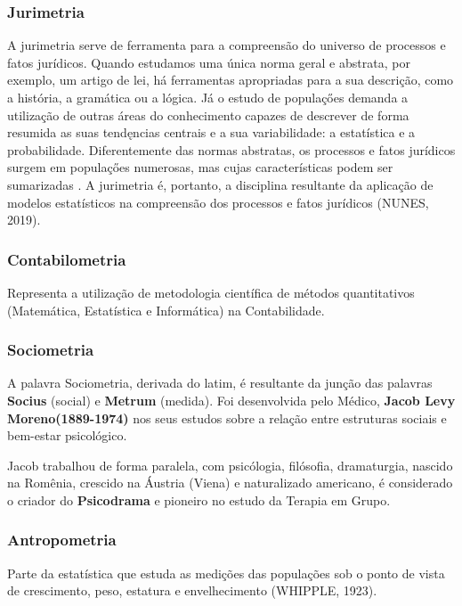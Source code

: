 \subsubsection{Jurimetria} 

A jurimetria serve de ferramenta para a compreensão do universo de processos e fatos jurídicos. Quando estudamos uma única norma geral e abstrata, por exemplo, um artigo de lei, há ferramentas apropriadas para a sua descrição, como a história, a gramática ou a lógica. Já o estudo de populaçőes demanda a utilização de outras áreas do conhecimento capazes de descrever de forma resumida as suas tendęncias centrais e a sua variabilidade: a estatística e a probabilidade. Diferentemente das normas abstratas, os processos e fatos jurídicos surgem em populaçőes numerosas, mas cujas características podem ser sumarizadas . A jurimetria é, portanto, a disciplina resultante da aplicação de modelos estatísticos na compreensão dos processos e fatos jurídicos (NUNES, 2019).\vskip0.3cm

\subsubsection{Contabilometria} 

Representa a utilização de metodologia científica de métodos quantitativos (Matemática, Estatística e Informática) na Contabilidade.



\subsubsection{Sociometria}

A palavra Sociometria, derivada do latim, é resultante da junção das palavras \textbf{Socius} (social) e \textbf{Metrum} (medida). Foi desenvolvida pelo Médico, \textbf{Jacob Levy Moreno(1889-1974)} nos seus estudos sobre a relação entre estruturas sociais e bem-estar psicológico.\vst

Jacob trabalhou de forma paralela, com psicólogia, filósofia, dramaturgia, nascido na Romênia, crescido na Áustria (Viena) e naturalizado americano, é considerado o criador do \textbf{Psicodrama} e pioneiro no estudo da Terapia em Grupo. 

\subsubsection{Antropometria}
Parte da estatística que estuda as medições das populações sob o ponto de vista de crescimento, peso, estatura e envelhecimento (WHIPPLE, 1923).


